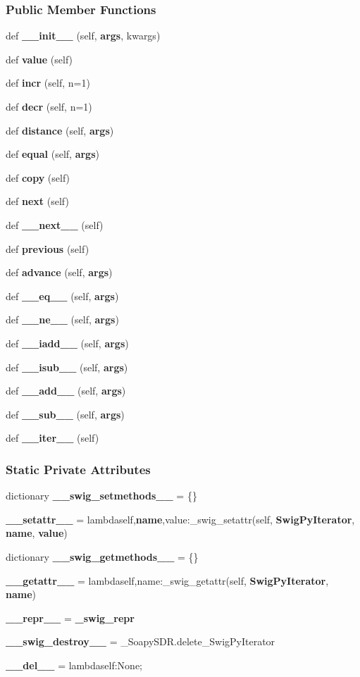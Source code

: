 \subsubsection*{Public Member Functions}
\begin{DoxyCompactItemize}
\item 
def {\bf \+\_\+\+\_\+init\+\_\+\+\_\+} (self, {\bf args}, kwargs)
\item 
def {\bf value} (self)
\item 
def {\bf incr} (self, n=1)
\item 
def {\bf decr} (self, n=1)
\item 
def {\bf distance} (self, {\bf args})
\item 
def {\bf equal} (self, {\bf args})
\item 
def {\bf copy} (self)
\item 
def {\bf next} (self)
\item 
def {\bf \+\_\+\+\_\+next\+\_\+\+\_\+} (self)
\item 
def {\bf previous} (self)
\item 
def {\bf advance} (self, {\bf args})
\item 
def {\bf \+\_\+\+\_\+eq\+\_\+\+\_\+} (self, {\bf args})
\item 
def {\bf \+\_\+\+\_\+ne\+\_\+\+\_\+} (self, {\bf args})
\item 
def {\bf \+\_\+\+\_\+iadd\+\_\+\+\_\+} (self, {\bf args})
\item 
def {\bf \+\_\+\+\_\+isub\+\_\+\+\_\+} (self, {\bf args})
\item 
def {\bf \+\_\+\+\_\+add\+\_\+\+\_\+} (self, {\bf args})
\item 
def {\bf \+\_\+\+\_\+sub\+\_\+\+\_\+} (self, {\bf args})
\item 
def {\bf \+\_\+\+\_\+iter\+\_\+\+\_\+} (self)
\end{DoxyCompactItemize}
\subsubsection*{Static Private Attributes}
\begin{DoxyCompactItemize}
\item 
dictionary {\bf \+\_\+\+\_\+swig\+\_\+setmethods\+\_\+\+\_\+} = \{\}
\item 
{\bf \+\_\+\+\_\+setattr\+\_\+\+\_\+} = lambdaself,{\bf name},value\+:\+\_\+swig\+\_\+setattr(self, {\bf Swig\+Py\+Iterator}, {\bf name}, {\bf value})
\item 
dictionary {\bf \+\_\+\+\_\+swig\+\_\+getmethods\+\_\+\+\_\+} = \{\}
\item 
{\bf \+\_\+\+\_\+getattr\+\_\+\+\_\+} = lambdaself,name\+:\+\_\+swig\+\_\+getattr(self, {\bf Swig\+Py\+Iterator}, {\bf name})
\item 
{\bf \+\_\+\+\_\+repr\+\_\+\+\_\+} = {\bf \+\_\+swig\+\_\+repr}
\item 
{\bf \+\_\+\+\_\+swig\+\_\+destroy\+\_\+\+\_\+} = \+\_\+\+Soapy\+S\+D\+R.\+delete\+\_\+\+Swig\+Py\+Iterator
\item 
{\bf \+\_\+\+\_\+del\+\_\+\+\_\+} = lambdaself\+:\+None;
\end{DoxyCompactItemize}


